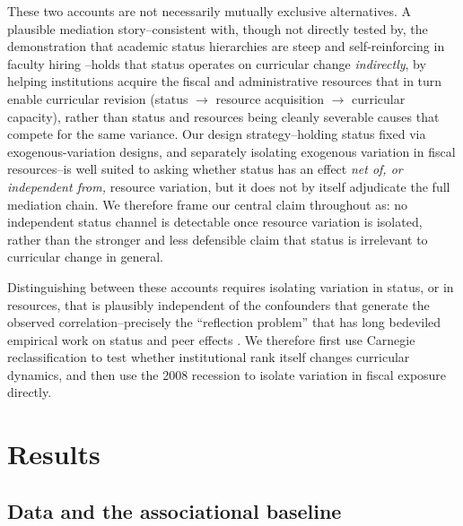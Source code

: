 \documentclass[11pt, letterpaper]{article}
\newcommand{\parencite}[1]{\cite{#1}}
\begin{document}
These two accounts are not necessarily mutually exclusive alternatives. A plausible mediation story--consistent with, though not directly tested by, the demonstration that academic status hierarchies are steep and self-reinforcing in faculty hiring \parencite{clauset2015}--holds that status operates on curricular change \emph{indirectly}, by helping institutions acquire the fiscal and administrative resources that in turn enable curricular revision (status $\rightarrow$ resource acquisition $\rightarrow$ curricular capacity), rather than status and resources being cleanly severable causes that compete for the same variance. Our design strategy--holding status fixed via exogenous-variation designs, and separately isolating exogenous variation in fiscal resources--is well suited to asking whether status has an effect \emph{net of, or independent from,} resource variation, but it does not by itself adjudicate the full mediation chain. We therefore frame our central claim throughout as: no independent status channel is detectable once resource variation is isolated, rather than the stronger and less defensible claim that status is irrelevant to curricular change in general.

Distinguishing between these accounts requires isolating variation in status, or in resources, that is plausibly independent of the confounders that generate the observed correlation--precisely the ``reflection problem'' that has long bedeviled empirical work on status and peer effects \parencite{manski1993}. We therefore first use Carnegie reclassification to test whether institutional rank itself changes curricular dynamics, and then use the 2008 recession to isolate variation in fiscal exposure directly.

\section*{Results}

\subsection*{Data and the associational baseline}
\end{document}
